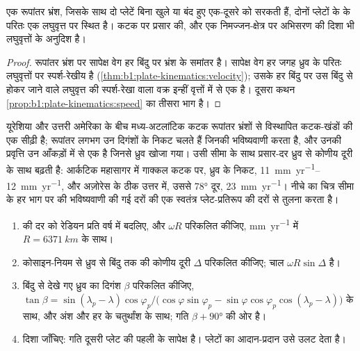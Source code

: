 \begin{proposition}[रूपांतर भ्रंश लघुवृत्तों पर चलते हैं]\label{prop:b1:plate-kinematics:transforms}
एक रूपांतर भ्रंश, जिसके साथ दो प्लेटें बिना खुले या बंद हुए एक-दूसरे को सरकती हैं, दोनों प्लेटों के  के परितः एक लघुवृत्त पर स्थित है। कटक पर प्रसार की, और एक निमज्जन-क्षेत्र पर अभिसरण की दिशा भी लघुवृत्तों के अनुदिश है।
\end{proposition}

\begin{proof}
रूपांतर भ्रंश पर सापेक्ष वेग हर बिंदु पर भ्रंश के समांतर है। सापेक्ष वेग हर जगह ध्रुव के परितः लघुवृत्तों पर स्पर्श-रेखीय है (\cref{thm:b1:plate-kinematics:velocity}); उसके हर बिंदु पर उस बिंदु से होकर जाने वाले लघुवृत्त की स्पर्श-रेखा वाला वक्र इन्हीं वृत्तों में से एक है। दूसरा कथन \cref{prop:b1:plate-kinematics:speed} का तीसरा भाग है।
\end{proof}

यूरेशिया और उत्तरी अमेरिका के बीच मध्य-अटलांटिक कटक रूपांतर भ्रंशों से विस्थापित कटक-खंडों की एक सीढ़ी है; रूपांतर लगभग उन दिगंशों के निकट चलते हैं जिनकी  भविष्यवाणी करता है, और उनकी प्रवृत्ति उन आँकड़ों में से एक है जिनसे ध्रुव खोजा गया। उसी सीमा के साथ प्रसार-दर ध्रुव से कोणीय दूरी के साथ बढ़ती है: आर्कटिक महासागर में गाक्कल कटक पर, ध्रुव के निकट, \qtyrange{11}{12}{mm.yr^{-1}}, और अज़ोरेस के ठीक उत्तर में, उससे \ang{78} दूर, \qty{23}{mm.yr^{-1}}। नीचे का चित्र सीमा के हर भाग पर  की भविष्यवाणी की गई दरों की एक स्वतंत्र प्लेट-प्रतिरूप की दरों से तुलना करता है।

\begin{method}[किसी बिंदु पर वेग]\label{met:b1:plate-kinematics:velocity}
\begin{enumerate}
  \item {} की दर को रेडियन प्रति वर्ष में बदलिए, और $\omega R$ परिकलित कीजिए, \unit{mm.yr^{-1}} में $R = \qty{6371}{km}$ के साथ।
  \item कोसाइन-नियम से ध्रुव से बिंदु तक की कोणीय दूरी $\Delta$ परिकलित कीजिए; चाल $\omega R\sin\Delta$ है।
  \item बिंदु से देखे गए ध्रुव का दिगंश $\beta$ परिकलित कीजिए, $\tan\beta = \sin(\lambda_p - \lambda)\cos\varphi_p /
        \bigl(\cos\varphi\sin\varphi_p - \sin\varphi\cos\varphi_p
        \cos(\lambda_p - \lambda)\bigr)$ के साथ, और अंश और हर के चतुर्थांश के साथ; गति $\beta + \ang{90}$ की ओर है।
  \item दिशा जाँचिए: गति दूसरी प्लेट की पहली के सापेक्ष है। प्लेटों का आदान-प्रदान उसे उलट देता है।
\end{enumerate}
\end{method}

